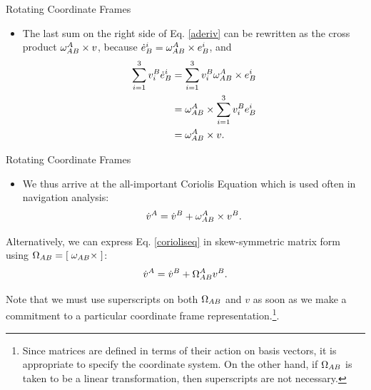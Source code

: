 \begin{frame}
Rotating Coordinate Frames
\begin{itemize}
\item The last sum on the right side of Eq. \eqref{aderiv} can be
rewritten as the cross product $\omega_{AB}^A\times v$, because
$\dot{e}_B^i=\omega_{AB}^A\times e_B^i$, and
\begin{align*}
   \sum_{i=1}^3 v_i^B\dot{e}_B^i &= \sum_{i=1}^3 v_i^B\omega_{AB}^A\times e_B^i \\
  &=\omega_{AB}^A\times \sum_{i=1}^3 v_i^B e_B^i \\
  &=\omega_{AB}^A\times v.
\end{align*}
\end{itemize}
\end{frame}
\begin{frame}
Rotating Coordinate Frames
\begin{itemize}
\item We thus arrive at the all-important Coriolis Equation which is
used often in navigation analysis:
\begin{equation}\label{corioliseq}
  \dot{v}^A=\dot{v}^B+\omega_{AB}^A\times v^B.
\end{equation}
\end{itemize}
\end{frame}
\begin{frame}

Alternatively, we can express Eq. \eqref{corioliseq} in
skew-symmetric matrix form using
$\Omega_{AB}=\left[\; \omega_{AB}\times \; \right]$:
\begin{equation}\label{coriolismateq}
  \dot{v}^A=\dot{v}^B+\Omega_{AB}^A v^B.
\end{equation}

Note that we must use superscripts on both $\Omega_{AB}$ and $v$
as soon as we make a commitment to a particular coordinate frame
representation.\footnote{Since matrices are defined in terms of
their action on basis vectors, it is appropriate to specify the
coordinate system.  On the other hand, if $\Omega_{AB}$ is taken
to be a linear transformation, then superscripts are not
necessary.}.

\end{frame}


